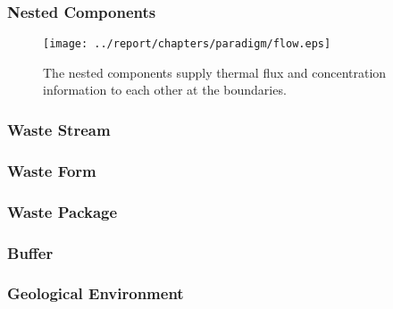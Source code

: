 

\begin{frame}[ctb!]
  \frametitle{Nested Components}
  \begin{figure}[h!]
    \begin{center}
      \texttt{[image: ../report/chapters/paradigm/flow.eps]}
    \end{center}
    \caption{The nested components supply thermal flux and concentration 
    information to each other at the boundaries.}
    \label{fig:flow}
  \end{figure}
\end{frame}

\begin{frame}[ctb!]
  \frametitle{Waste Stream}
\end{frame}

\begin{frame}[ctb!]
  \frametitle{Waste Form}
\end{frame}

\begin{frame}[ctb!]
  \frametitle{Waste Package}
\end{frame}

\begin{frame}[ctb!]
  \frametitle{Buffer}
\end{frame}

\begin{frame}[ctb!]
  \frametitle{Geological Environment}
\end{frame}


